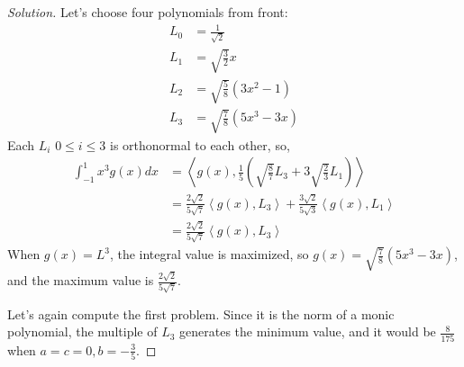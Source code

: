 \documentclass[a4paper, 12pt]{article}
\theoremstyle{Mydefinition}
\theoremstyle{Mytheorem}
\begin{document}
\begin{proof}[Solution]
Let's choose four polynomials from front:
\begin{equation}
    \begin{split}
        L_0 &= \frac{1}{\sqrt{2}}\\
        L_1 &= \sqrt{\frac{3}{2}}x \\
        L_2 &= \sqrt{\frac{5}{8}}(3x^2-1) \\
        L_3 &= \sqrt{\frac{7}{8}}(5x^3-3x)
    \end{split}
\end{equation}
Each $L_i$ $0\leq i\leq 3$ is orthonormal to each other, so,
\begin{equation}
\begin{split}
    \int_{-1}^1 x^3 g(x)dx &= \left\langle g(x),\frac{1}{5}\left(\sqrt{\frac{8}{7}} L_3 + 3 \sqrt{\frac{2}{3}}L_1\right)\right\rangle \\
    &= \frac{2\sqrt{2}}{5\sqrt{7}}\left\langle g(x),L_3\right\rangle + \frac{3\sqrt{2}}{5\sqrt{3}}\left\langle g(x),L_1\right\rangle \\
    &= \frac{2\sqrt{2}}{5\sqrt{7}}\left\langle g(x),L_3\right\rangle
\end{split}
\end{equation}
When $g(x)=L^3$, the integral value is maximized, so $g(x) = \sqrt{\frac{7}{8}}(5x^3-3x)$, and the maximum value is $\frac{2\sqrt{2}}{5\sqrt{7}}$.

Let's again compute the first problem. Since it is the norm of a monic polynomial, the multiple of $L_3$ generates the minimum value, and it would be $\frac{8}{175}$ when $a=c=0, b=-\frac{3}{5}$.
\end{proof}
\end{document}
